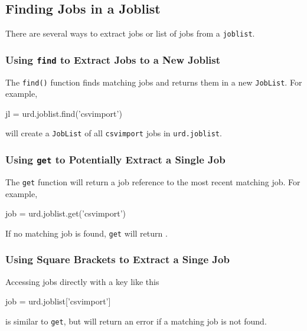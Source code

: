 \subsection{Finding Jobs in a Joblist}
There are several ways to extract jobs or list of jobs from
a \texttt{joblist}.


\subsubsection*{Using \texttt{find} to Extract Jobs to a New Joblist}
The \texttt{find()} function finds matching jobs and returns them in a
new \texttt{JobList}.  For example,
\begin{python}
jl = urd.joblist.find('csvimport')
\end{python}
will create a \texttt{JobList} of all \texttt{csvimport} jobs
in \texttt{urd.joblist}.


\subsubsection*{Using \texttt{get} to Potentially Extract a Single Job}
The \texttt{get} function will return a job reference to the most
recent matching job.  For example,
\begin{python}
job = urd.joblist.get('csvimport')
\end{python}
If no matching job is found, \texttt{get} will return \pyNone.


\subsubsection*{Using Square Brackets to Extract a Singe Job}
Accessing jobs directly with a key like this
\begin{python}
job = urd.joblist['csvimport']
\end{python}
is similar to \texttt{get}, but will return an error if a matching job
is not found.



